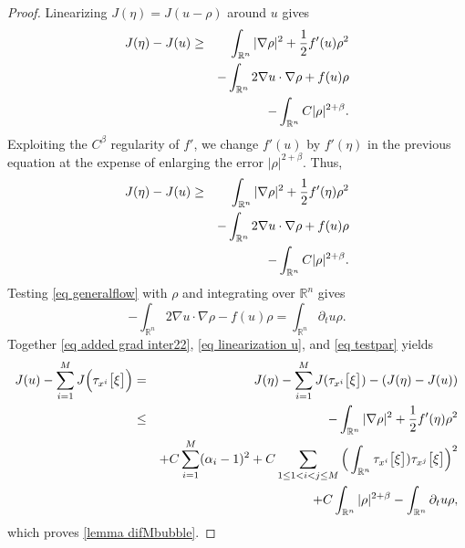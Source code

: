 \documentclass[11pt,letterpaper,reqno]{amsart}
\newcommand{\R}{\mathbb{R}}
\newcommand{\pa}{\partial}
\theoremstyle{plain}%
\theoremstyle{definition}
\numberwithin{equation}{section}
\numberwithin{figure}{section}
\begin{document}
\begin{proof}
Linearizing $J(\eta)=J(u-\rho)$ around $u$ gives \begin{eqnarray}\notag J(\eta)-J(u)& \geq&\int_{\R^n} |\nabla \rho|^2 + \frac{1}{2} f'(u) \rho^2\\\notag && -\int_{\R^n} 2\nabla u\cdot \nabla \rho+ f(u)\rho \\ \notag && -\int_{\R^n}C|\rho|^{2+\beta}. 
\end{eqnarray} 
Exploiting the $C^{\beta}$ regularity of $f'$, we change $f'(u)$ by $f'(\eta)$ in the previous equation at the expense of enlarging the error $|\rho|^{2+\beta}$. Thus,
\begin{eqnarray}\notag J(\eta)-J(u)& \geq&\int_{\R^n} |\nabla \rho|^2 + \frac{1}{2} f'(\eta) \rho^2\\\notag && -\int_{\R^n} 2\nabla u\cdot \nabla \rho+ f(u)\rho \\ \label{eq linearization u} && -\int_{\R^n}C|\rho|^{2+\beta}.
\end{eqnarray}
Testing \eqref{eq generalflow} with $\rho$ and integrating over $\R^n$ gives
\begin{equation}\label{eq testpar} -\int_{\R^n} 2\nabla u\cdot \nabla \rho - f(u)\rho= \int_{\R^n} \pa_t u \rho. \end{equation} Together \eqref{eq added grad inter22}, \eqref{eq linearization u}, and \eqref{eq testpar} yields \begin{eqnarray*}\notag J(u)- \sum_{i=1}^MJ\Big( \tau_{x^i}\big[\xi\big]\Big)&=& J(\eta)-\sum_{i=1}^M J(\tau_{x^i}\big[\xi\big]) - (J(\eta)-J(u))\\\notag &\leq& -\int_{\R^n} |\nabla \rho|^2 + \frac{1}{2}f'(\eta) \rho^2\\\notag &&+C\sum_{i=1}^M (\alpha_i-1)^2+ C \sum_{1\leq 1 <i<j\leq M} \Big( \int_{\R^n} \tau_{x^i}\big[\xi\big])\tau_{x^j}\big[\xi\big]\Big)^2\\
&&+ C\int_{\R^n}|\rho|^{2+\beta}-\int_{\R^n} \pa_t u \rho,
\end{eqnarray*} 
which proves \eqref{lemma difMbubble}.
\end{proof}
\end{document}
